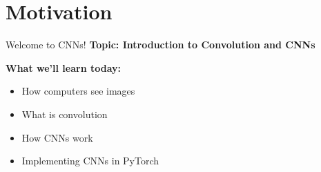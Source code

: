 \section{Motivation}

\begin{frame}[t]{Welcome to CNNs!}
    \textbf{Topic: Introduction to Convolution and CNNs}

    \vspace{1em}
    \textbf{What we’ll learn today:}
    \begin{itemize}
        \item How computers see images
        \item What is convolution
        \item How CNNs work
        \item Implementing CNNs in PyTorch
    \end{itemize}
\end{frame}

